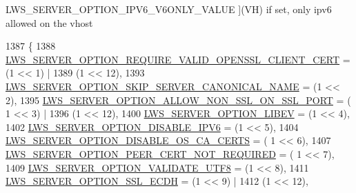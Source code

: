 \begin{Desc}
\begin{description}
{L\+W\+S\+\_\+\+S\+E\+R\+V\+E\+R\+\_\+\+O\+P\+T\+I\+O\+N\+\_\+\+I\+P\+V6\+\_\+\+V6\+O\+N\+L\+Y\+\_\+\+V\+A\+L\+UE\hypertarget{group__context-and-vhost_gga41c2d763f78cc248df3b9f8645dbd2a5aca5d42820b65eac5618ec3f0bd8a1160}{}\label{group__context-and-vhost_gga41c2d763f78cc248df3b9f8645dbd2a5aca5d42820b65eac5618ec3f0bd8a1160}
}](VH) if set, only ipv6 allowed on the vhost \end{description}
\end{Desc}

\begin{DoxyCode}
1387                          \{
1388         \hyperlink{group__context-and-vhost_gga41c2d763f78cc248df3b9f8645dbd2a5a274ed462a1a9239eb6ddf9007f5b7092}{LWS\_SERVER\_OPTION\_REQUIRE\_VALID\_OPENSSL\_CLIENT\_CERT}  
      = (1 << 1) |
1389                                                                   (1 << 12),
1393         \hyperlink{group__context-and-vhost_gga41c2d763f78cc248df3b9f8645dbd2a5a6582c985ee0ceaadc1d277030eae2d7c}{LWS\_SERVER\_OPTION\_SKIP\_SERVER\_CANONICAL\_NAME}                
      = (1 << 2),
1395         \hyperlink{group__context-and-vhost_gga41c2d763f78cc248df3b9f8645dbd2a5a1cc4562d05cba52a6dfa0697a65ade0d}{LWS\_SERVER\_OPTION\_ALLOW\_NON\_SSL\_ON\_SSL\_PORT}          = (
      1 << 3) |
1396                                                                   (1 << 12),
1400         \hyperlink{group__context-and-vhost_gga41c2d763f78cc248df3b9f8645dbd2a5a273d9975675130de0c6dc937dde7c8a6}{LWS\_SERVER\_OPTION\_LIBEV}                                  = (1 << 4),
1402         \hyperlink{group__context-and-vhost_gga41c2d763f78cc248df3b9f8645dbd2a5a34ab36e68c0d593b6f19b8d5ef1240a9}{LWS\_SERVER\_OPTION\_DISABLE\_IPV6}                            = (1 << 5),
1404         \hyperlink{group__context-and-vhost_gga41c2d763f78cc248df3b9f8645dbd2a5a4933347a821e73c3f1e13fb6bfc7ad93}{LWS\_SERVER\_OPTION\_DISABLE\_OS\_CA\_CERTS}                      = (
      1 << 6),
1407         \hyperlink{group__context-and-vhost_gga41c2d763f78cc248df3b9f8645dbd2a5ac56a8a6590e74a8016d0fae09fb404fc}{LWS\_SERVER\_OPTION\_PEER\_CERT\_NOT\_REQUIRED}                = (
      1 << 7),
1409         \hyperlink{group__context-and-vhost_gga41c2d763f78cc248df3b9f8645dbd2a5aa0158b4e85420811e6b0f1378c6ded0f}{LWS\_SERVER\_OPTION\_VALIDATE\_UTF8}                          = (1 << 8),
1411         \hyperlink{group__context-and-vhost_gga41c2d763f78cc248df3b9f8645dbd2a5a1b2f8bde0f62adc7ebe81b2043f34c0c}{LWS\_SERVER\_OPTION\_SSL\_ECDH}                            = (1 << 9) |
1412                                                                   (1 << 12),

\end{DoxyCode}
